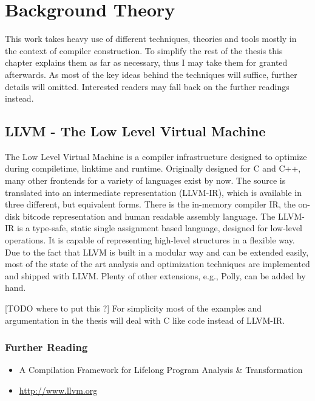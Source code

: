 
\chapter{Background Theory} %
\label{Chapter2}

\orange
\begin{shaded}
This work takes heavy use of different techniques, theories and tools mostly 
in the context of compiler construction. To simplify the rest of the thesis 
this chapter explains them as far as necessary, thus I may take
them for granted afterwards. As most of the key ideas behind the techniques
will suffice, further details will omitted. 
Interested readers may fall back on the further readings instead. 

\end{shaded}


\yellow
\begin{shaded}
\section{LLVM - The Low Level Virtual Machine}
\label{LLVM}
The Low Level Virtual Machine is a compiler infrastructure designed to optimize
during compiletime, linktime and runtime. Originally designed for C and C++, 
many other frontends for a variety of languages exist by now. The source is 
translated into an intermediate representation (LLVM-IR), which is available 
in three different, but equivalent forms. There is the in-memory compiler IR, 
the on-disk bitcode representation and human readable assembly language.
The LLVM-IR is a type-safe, static single assignment based language,
designed for low-level operations. It is capable of 
representing high-level structures in a flexible way.
Due to the fact that LLVM is built in a modular 
way and can be extended easily, most of the state of the art analysis and
optimization techniques are implemented and shipped with LLVM. Plenty of other
extensions, e.g., Polly, can be added by hand. 

[TODO where to put this ?]
For simplicity most of the examples and argumentation in the thesis will deal 
with C like code instead of LLVM-IR. 

\subsection*{Further Reading}

\begin{itemize}
  \item A Compilation Framework for Lifelong Program Analysis \& Transformation
    \cite{LLVM:CGO04}  
  \item \url{http://www.llvm.org} \nocite{LLVM:Online}
\end{itemize}

\end{shaded}


